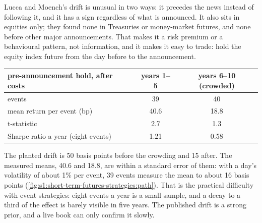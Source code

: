 Lucca and Moench's drift is unusual in two ways: it precedes the news instead of following it, and it has a sign regardless of what is announced. It
also sits in equities only; they found none in Treasuries or money-market futures, and none before other major announcements. That makes it a risk
premium or a behavioural pattern, not information, and it makes it easy to trade: hold the equity index future from the day before to the
announcement.

\begin{center}
\small
\begin{tabular}{@{}lcc@{}}
\toprule
pre-announcement hold, after costs & years 1--5 & years 6--10 (crowded)\\
\midrule
events & 39 & 40\\
mean return per event (bp) & 40.6 & 18.8\\
t-statistic & 2.7 & 1.3\\
Sharpe ratio a year (eight events) & 1.21 & 0.58\\
\bottomrule
\end{tabular}
\end{center}

The planted drift is 50 basis points before the crowding and 15 after. The measured means, 40.6 and 18.8, are within a standard error of them: with a
day's volatility of about 1\% per event, 39 events measure the mean to about 16 basis points (\cref{fig:s1:short-term-futures-strategies:path}). That is
the practical difficulty with event strategies: eight events a year is a small sample, and a decay to a third of the effect is barely visible in five
years. The published drift is a strong prior, and a live book can only confirm it slowly.

\begin{omfigure}

\label{fig:s1:short-term-futures-strategies:path}
\end{omfigure}

